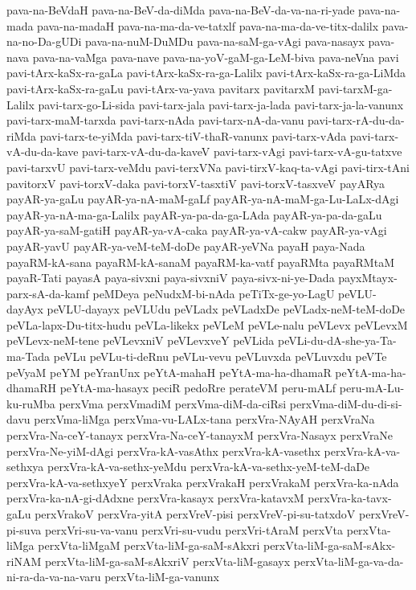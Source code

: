 {pava-na-BeVdaH
pava-na-BeV-da-diMda
pava-na-BeV-da-va-na-ri-yade
pava-na-mada
pava-na-madaH
pava-na-ma-da-ve-tatxlf
pava-na-ma-da-ve-titx-dalilx
pava-na-no-Da-gUDi
pava-na-nuM-DuMDu
pava-na-saM-ga-vAgi
pava-nasayx
pava-nava
pava-na-vaMga
pava-nave
pava-na-yoV-gaM-ga-LeM-biva
pava-neVna
pavi
pavi-tArx-kaSx-ra-gaLa
pavi-tArx-kaSx-ra-ga-Lalilx
pavi-tArx-kaSx-ra-ga-LiMda
pavi-tArx-kaSx-ra-gaLu
pavi-tArx-va-yava
pavitarx
pavitarxM
pavi-tarxM-ga-Lalilx
pavi-tarx-go-Li-sida
pavi-tarx-jala
pavi-tarx-ja-lada
pavi-tarx-ja-la-vanunx
pavi-tarx-maM-tarxda
pavi-tarx-nAda
pavi-tarx-nA-da-vanu
pavi-tarx-rA-du-da-riMda
pavi-tarx-te-yiMda
pavi-tarx-tiV-thaR-vanunx
pavi-tarx-vAda
pavi-tarx-vA-du-da-kave
pavi-tarx-vA-du-da-kaveV
pavi-tarx-vAgi
pavi-tarx-vA-gu-tatxve
pavi-tarxvU
pavi-tarx-veMdu
pavi-terxVNa
pavi-tirxV-kaq-ta-vAgi
pavi-tirx-tAni
pavitorxV
pavi-torxV-daka
pavi-torxV-tasxtiV
pavi-torxV-tasxveV
payARya
payAR-ya-gaLu
payAR-ya-nA-maM-gaLf
payAR-ya-nA-maM-ga-Lu-LaLx-dAgi
payAR-ya-nA-ma-ga-Lalilx
payAR-ya-pa-da-ga-LAda
payAR-ya-pa-da-gaLu
payAR-ya-saM-gatiH
payAR-ya-vA-caka
payAR-ya-vA-cakw
payAR-ya-vAgi
payAR-yavU
payAR-ya-veM-teM-doDe
payAR-yeVNa
payaH
paya-Nada
payaRM-kA-sana
payaRM-kA-sanaM
payaRM-ka-vatf
payaRMta
payaRMtaM
payaR-Tati
payasA
paya-sivxni
paya-sivxniV
paya-sivx-ni-ye-Dada
payxMtayx-parx-sA-da-kamf
peMDeya
peNudxM-bi-nAda
peTiTx-ge-yo-LagU
peVLU-dayAyx
peVLU-dayayx
peVLUdu
peVLadx
peVLadxDe
peVLadx-neM-teM-doDe
peVLa-lapx-Du-titx-hudu
peVLa-likekx
peVLeM
peVLe-nalu
peVLevx
peVLevxM
peVLevx-neM-tene
peVLevxniV
peVLevxveY
peVLida
peVLi-du-dA-she-ya-Ta-ma-Tada
peVLu
peVLu-ti-deRnu
peVLu-vevu
peVLuvxda
peVLuvxdu
peVTe
peVyaM
peYM
peYranUnx
peYtA-mahaH
peYtA-ma-ha-dhamaR
peYtA-ma-ha-dhamaRH
peYtA-ma-hasayx
peciR
pedoRre
perateVM
peru-mALf
peru-mA-Lu-ku-ruMba
perxVma
perxVmadiM
perxVma-diM-da-ciRsi
perxVma-diM-du-di-si-davu
perxVma-liMga
perxVma-vu-LALx-tana
perxVra-NAyAH
perxVraNa
perxVra-Na-ceY-tanayx
perxVra-Na-ceY-tanayxM
perxVra-Nasayx
perxVraNe
perxVra-Ne-yiM-dAgi
perxVra-kA-vasAthx
perxVra-kA-vasethx
perxVra-kA-va-sethxya
perxVra-kA-va-sethx-yeMdu
perxVra-kA-va-sethx-yeM-teM-daDe
perxVra-kA-va-sethxyeY
perxVraka
perxVrakaH
perxVrakaM
perxVra-ka-nAda
perxVra-ka-nA-gi-dAdxne
perxVra-kasayx
perxVra-katavxM
perxVra-ka-tavx-gaLu
perxVrakoV
perxVra-yitA
perxVreV-pisi
perxVreV-pi-su-tatxdoV
perxVreV-pi-suva
perxVri-su-va-vanu
perxVri-su-vudu
perxVri-tAraM
perxVta
perxVta-liMga
perxVta-liMgaM
perxVta-liM-ga-saM-sAkxri
perxVta-liM-ga-saM-sAkx-riNAM
perxVta-liM-ga-saM-sAkxriV
perxVta-liM-gasayx
perxVta-liM-ga-va-da-ni-ra-da-va-na-varu
perxVta-liM-ga-vanunx
}
